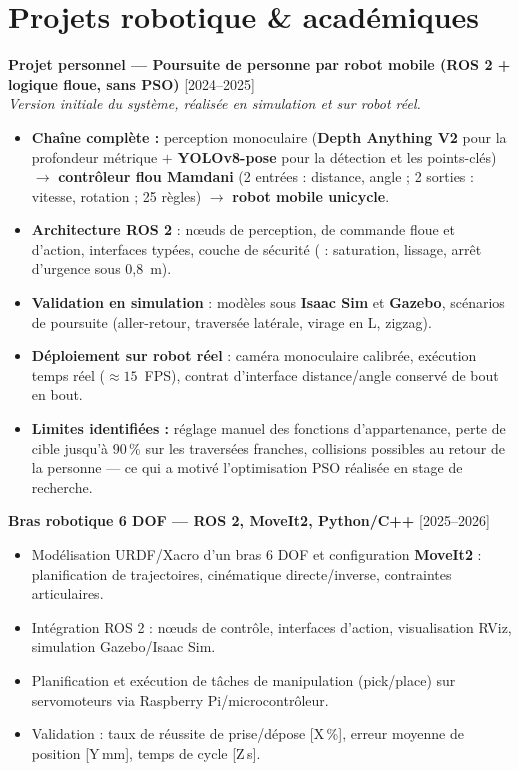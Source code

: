 \documentclass[11pt,a4paper]{article}
\newcommand{\cventry}[3]{%
    \textbf{#1} \hfill #2\\
    #3
}
\begin{document}
\section{Projets robotique \& académiques}

\cventry{Projet personnel — Poursuite de personne par robot mobile (ROS 2 + logique floue, sans PSO)}{[2024--2025]}{%
\textit{Version initiale du système, réalisée en simulation et sur robot réel.}
\begin{itemize}[leftmargin=*, nosep]
    \item \textbf{Chaîne complète :} perception monoculaire (\textbf{Depth Anything V2} pour la profondeur métrique $+$ \textbf{YOLOv8-pose} pour la détection et les points-clés) $\to$ \textbf{contrôleur flou Mamdani} (2 entrées : distance, angle ; 2 sorties : vitesse, rotation ; 25 règles) $\to$ \textbf{robot mobile unicycle}.
    \item \textbf{Architecture ROS 2} : nœuds de perception, de commande floue et d'action, interfaces typées, couche de sécurité (\code{RobotTracker} : saturation, lissage, arrêt d'urgence sous 0,8~m).
    \item \textbf{Validation en simulation} : modèles sous \textbf{Isaac Sim} et \textbf{Gazebo}, scénarios de poursuite (aller-retour, traversée latérale, virage en L, zigzag).
    \item \textbf{Déploiement sur robot réel} : caméra monoculaire calibrée, exécution temps réel ($\approx 15$~FPS), contrat d'interface distance/angle conservé de bout en bout.
    \item \textbf{Limites identifiées :} réglage manuel des fonctions d'appartenance, perte de cible jusqu'à 90\,\% sur les traversées franches, collisions possibles au retour de la personne — ce qui a motivé l'optimisation PSO réalisée en stage de recherche.
\end{itemize}
}

\cventry{Bras robotique 6 DOF — ROS 2, MoveIt2, Python/C++}{[2025--2026]}{%
\begin{itemize}[leftmargin=*, nosep]
    \item Modélisation URDF/Xacro d'un bras 6 DOF et configuration \textbf{MoveIt2} : planification de trajectoires, cinématique directe/inverse, contraintes articulaires.
    \item Intégration ROS 2 : nœuds de contrôle, interfaces d'action, visualisation RViz, simulation Gazebo/Isaac Sim.
    \item Planification et exécution de tâches de manipulation (pick/place) sur servomoteurs via Raspberry Pi/microcontrôleur.
    \item Validation : taux de réussite de prise/dépose [X\,\%], erreur moyenne de position [Y\,mm], temps de cycle [Z\,s].
\end{itemize}
}
\end{document}
